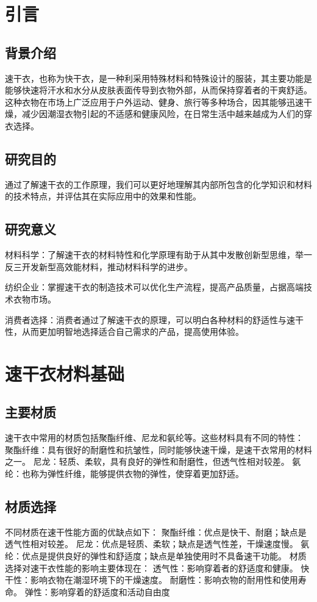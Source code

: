\documentclass{article}
\begin{document}
\begin{multicols}{2}

\section{引言}
\subsection{背景介绍}
速干衣，也称为快干衣，是一种利采用特殊材料和特殊设计的服装，其主要功能是能够快速将汗水和水分从皮肤表面传导到衣物外部，从而保持穿着者的干爽舒适。这种衣物在市场上广泛应用于户外运动、健身、旅行等多种场合，因其能够迅速干燥，减少因潮湿衣物引起的不适感和健康风险，在日常生活中越来越成为人们的穿衣选择。
\subsection{研究目的}
通过了解速干衣的工作原理，我们可以更好地理解其内部所包含的化学知识和材料的技术特点，并评估其在实际应用中的效果和性能。
\subsection{研究意义}
材料科学：了解速干衣的材料特性和化学原理有助于从其中发散创新型思维，举一反三开发新型高效能材料，推动材料科学的进步。

纺织企业：掌握速干衣的制造技术可以优化生产流程，提高产品质量，占据高端技术衣物市场。

消费者选择：消费者通过了解速干衣的原理，可以明白各种材料的舒适性与速干性，从而更加明智地选择适合自己需求的产品，提高使用体验。
\section{速干衣材料基础}
\subsection{主要材质}
速干衣中常用的材质包括聚酯纤维、尼龙和氨纶等。这些材料具有不同的特性：
聚酯纤维：具有很好的耐磨性和抗皱性，同时能够快速干燥，是速干衣常用的材料之一。
尼龙：轻质、柔软，具有良好的弹性和耐磨性，但透气性相对较差。
氨纶：也称为弹性纤维，能够提供衣物的弹性，使穿着更加舒适。
\subsection{材质选择}
不同材质在速干性能方面的优缺点如下：
聚酯纤维：优点是快干、耐磨；缺点是透气性相对较差。
尼龙：优点是轻质、柔软；缺点是透气性差，干燥速度慢。
氨纶：优点是提供良好的弹性和舒适度；缺点是单独使用时不具备速干功能。
材质选择对速干衣性能的影响主要体现在：
透气性：影响穿着者的舒适度和健康。
快干性：影响衣物在潮湿环境下的干燥速度。
耐磨性：影响衣物的耐用性和使用寿命。
弹性：影响穿着的舒适度和活动自由度



\end{multicols}
\end{document}
